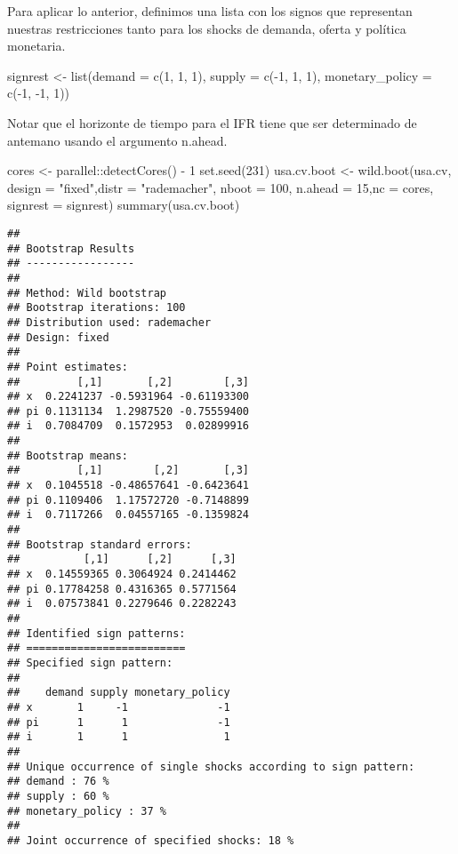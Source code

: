 \documentclass[
]{book}
\newenvironment{Shaded}{\begin{snugshade}}{\end{snugshade}}
\newcommand{\AttributeTok}[1]{\textcolor[rgb]{0.77,0.63,0.00}{#1}}
\newcommand{\DecValTok}[1]{\textcolor[rgb]{0.00,0.00,0.81}{#1}}
\newcommand{\FunctionTok}[1]{\textcolor[rgb]{0.00,0.00,0.00}{#1}}
\newcommand{\NormalTok}[1]{#1}
\newcommand{\OtherTok}[1]{\textcolor[rgb]{0.56,0.35,0.01}{#1}}
\newcommand{\SpecialCharTok}[1]{\textcolor[rgb]{0.00,0.00,0.00}{#1}}
\newcommand{\StringTok}[1]{\textcolor[rgb]{0.31,0.60,0.02}{#1}}
\begin{document}
Para aplicar lo anterior, definimos una lista con los signos que representan nuestras restricciones tanto para los shocks de demanda, oferta y política monetaria.

\begin{Shaded}
\begin{Highlighting}[]
\NormalTok{signrest }\OtherTok{\textless{}{-}} \FunctionTok{list}\NormalTok{(}\AttributeTok{demand =} \FunctionTok{c}\NormalTok{(}\DecValTok{1}\NormalTok{, }\DecValTok{1}\NormalTok{, }\DecValTok{1}\NormalTok{), }\AttributeTok{supply =} \FunctionTok{c}\NormalTok{(}\SpecialCharTok{{-}}\DecValTok{1}\NormalTok{, }\DecValTok{1}\NormalTok{, }\DecValTok{1}\NormalTok{), }\AttributeTok{monetary\_policy =} \FunctionTok{c}\NormalTok{(}\SpecialCharTok{{-}}\DecValTok{1}\NormalTok{, }\SpecialCharTok{{-}}\DecValTok{1}\NormalTok{, }\DecValTok{1}\NormalTok{))}
\end{Highlighting}
\end{Shaded}

Notar que el horizonte de tiempo para el IFR tiene que ser determinado de antemano usando el argumento n.ahead.

\begin{Shaded}
\begin{Highlighting}[]
\NormalTok{cores }\OtherTok{\textless{}{-}}\NormalTok{ parallel}\SpecialCharTok{::}\FunctionTok{detectCores}\NormalTok{() }\SpecialCharTok{{-}} \DecValTok{1}
\FunctionTok{set.seed}\NormalTok{(}\DecValTok{231}\NormalTok{)}
\NormalTok{usa.cv.boot }\OtherTok{\textless{}{-}} \FunctionTok{wild.boot}\NormalTok{(usa.cv, }\AttributeTok{design =} \StringTok{"fixed"}\NormalTok{,}\AttributeTok{distr =} \StringTok{"rademacher"}\NormalTok{, }\AttributeTok{nboot =} \DecValTok{100}\NormalTok{, }\AttributeTok{n.ahead =} \DecValTok{15}\NormalTok{,}\AttributeTok{nc =}\NormalTok{ cores, }\AttributeTok{signrest =}\NormalTok{ signrest)}
\FunctionTok{summary}\NormalTok{(usa.cv.boot)}
\end{Highlighting}
\end{Shaded}

\begin{verbatim}
## 
## Bootstrap Results
## ----------------- 
## 
## Method: Wild bootstrap
## Bootstrap iterations: 100
## Distribution used: rademacher
## Design: fixed
## 
## Point estimates: 
##         [,1]       [,2]        [,3]
## x  0.2241237 -0.5931964 -0.61193300
## pi 0.1131134  1.2987520 -0.75559400
## i  0.7084709  0.1572953  0.02899916
## 
## Bootstrap means: 
##         [,1]        [,2]       [,3]
## x  0.1045518 -0.48657641 -0.6423641
## pi 0.1109406  1.17572720 -0.7148899
## i  0.7117266  0.04557165 -0.1359824
## 
## Bootstrap standard errors: 
##          [,1]      [,2]      [,3]
## x  0.14559365 0.3064924 0.2414462
## pi 0.17784258 0.4316365 0.5771564
## i  0.07573841 0.2279646 0.2282243
## 
## Identified sign patterns: 
## =========================
## Specified sign pattern: 
## 
##    demand supply monetary_policy
## x       1     -1              -1
## pi      1      1              -1
## i       1      1               1
## 
## Unique occurrence of single shocks according to sign pattern: 
## demand : 76 % 
## supply : 60 % 
## monetary_policy : 37 % 
## 
## Joint occurrence of specified shocks: 18 %
\end{verbatim}
\end{document}
